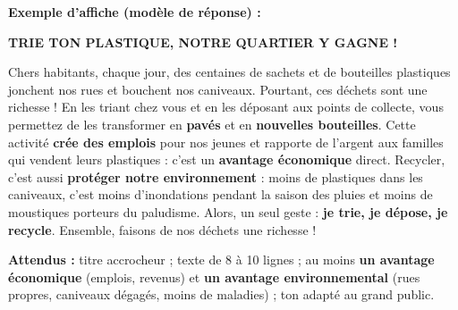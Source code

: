 \documentclass[11pt]{article}
\begin{document}
\begin{corrige}
\textbf{Exemple d'affiche (modèle de réponse) :}
\begin{center}
\textbf{\large TRIE TON PLASTIQUE, NOTRE QUARTIER Y GAGNE !}
\end{center}
Chers habitants, chaque jour, des centaines de sachets et de bouteilles plastiques jonchent nos rues et bouchent nos caniveaux. Pourtant, ces déchets sont une richesse ! En les triant chez vous et en les déposant aux points de collecte, vous permettez de les transformer en \textbf{pavés} et en \textbf{nouvelles bouteilles}. Cette activité \textbf{crée des emplois} pour nos jeunes et rapporte de l'argent aux familles qui vendent leurs plastiques : c'est un \textbf{avantage économique} direct. Recycler, c'est aussi \textbf{protéger notre environnement} : moins de plastiques dans les caniveaux, c'est moins d'inondations pendant la saison des pluies et moins de moustiques porteurs du paludisme. Alors, un seul geste : \textbf{je trie, je dépose, je recycle}. Ensemble, faisons de nos déchets une richesse !
\par\medskip
\textbf{Attendus :} titre accrocheur ; texte de 8 à 10 lignes ; au moins \textbf{un avantage économique} (emplois, revenus) et \textbf{un avantage environnemental} (rues propres, caniveaux dégagés, moins de maladies) ; ton adapté au grand public.
\end{corrige}
\end{document}
